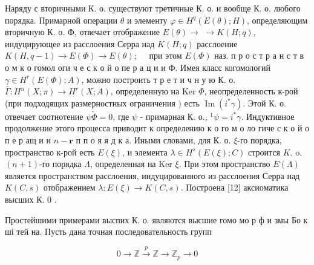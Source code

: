 \documentclass[10pt]{article}
\begin{document}
Наряду с вторичными К. о. существуют третичные К. о. и вообще К. о. любого порядка. Примарной операции $\theta$ и элементу $\varphi \in H^{q}(E(\theta) ; H)$, определяющим вторичную К. о. Ф, отвечает отображение $E(\theta) \rightarrow$ $\rightarrow K(H ; q)$, индуцирующее из расслоения Серра над $K(H ; q)$ расслоение $K(H, q-1) \rightarrow E(\Phi) \rightarrow E(\theta) ; \quad$ при этом $E(\Phi)$ наз. п р о с т р а н с т в о м к о гомол оги ч е с к о й о пе р а ц и и Ф. Имея класс когомологий $\gamma \in H^{r}(E(\Phi) ; A)$, можно построить т р е т и ч н у ю К. о. $\bar{\Gamma}: H^{n}(X ; \pi) \rightarrow H^{r}(X ; A)$, определенную на Ker $\Phi$, неопределенность к-рой (при подходящих размерностных ограничения $)$ есть $\operatorname{Im}\left(i^{*} \gamma\right)$. Этой К. о. отвечает соотнотение $\psi \check{\Phi}=0$, где $\psi$ - примарная К. о., ${ }^{1} \psi=i^{*} \gamma$. Индуктивное продолжение этого процесса приводит к определению к о го м о ло гиче с к о й о п е р ащ и и $n-\mathbf{r}$ п п о я я д к а. Иными словами, для К. о. $\xi$-го порядка, пространство к-рой есть $E(\xi)$, и элемента $\lambda \in H^{s}(E(\xi) ; C)$ строится $K$. o. $(n+1)$-го порядка $\Lambda$, определенная на Ker $\xi$. При этом пространство $E(\Lambda)$ является пространством расслоения, индуцированного из расслоения Серра над $K(C, s)$ отображением $\lambda: E(\xi) \rightarrow K(C, s)$. Построена [12] аксиоматика высших К. 0 .



Простейшими примерами выспих К. о. являются высшие гомо мо р ф и змы Бо к ші тей на. Пусть дана точная последовательность групп



\[

0 \longrightarrow \mathbb{Z} \stackrel{p}{\longrightarrow} \mathbb{Z} \longrightarrow \mathbb{Z}_{p} \longrightarrow 0

\]
\end{document}
